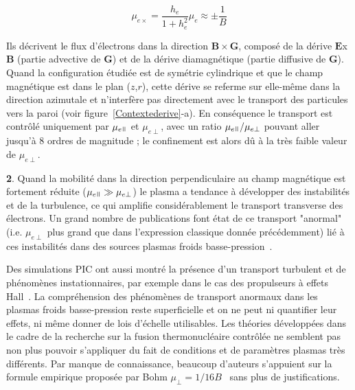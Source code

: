 \begin{refsection}
\begin{equation}
\mu_{e\times}=\frac{h_e}{1+h_e^2}\mu_e\approx\pm\frac{1}{B}
\end{equation}

Ils décrivent le flux d'électrons dans la direction $\mathbf
B\times\mathbf G$, composé de la dérive $\mathbf E$x$\mathbf B$ (partie
advective de $\mathbf G$) et de la dérive diamagnétique (partie diffusive de
$\mathbf G$). Quand la configuration étudiée est de symétrie cylindrique et que le champ magnétique est
dans le plan ($z$,$r$), cette dérive se referme sur elle-même dans la direction
azimutale et n'interfère pas directement avec le transport des particules vers
la paroi (voir figure~\ref{Contextederive}-a). En conséquence le transport est
contrôlé uniquement par $\mu_{e\para}$ et $\mu_{e\perp}$, avec un ratio $\mu_{e\para}/\mu_{e\perp}$ pouvant aller
jusqu'à 8 ordres de magnitude ; le confinement est alors dû à la très faible
valeur de $\mu_{e\perp}$.
\vspace{1cm}

\textbf{2}. Quand la mobilité dans la direction perpendiculaire au champ
magnétique est fortement réduite ($\mu_{e\para}\gg\mu_{e\perp}$) le plasma a tendance à
développer des instabilités et de la turbulence, ce qui amplifie
considérablement le transport transverse des électrons. Un grand nombre de
publications font état de ce transport "anormal" (i.e.
$\mu_{e\perp}$ plus grand que dans l'expression classique donnée précédemment)
lié à ces instabilités dans des sources plasmas froids
basse-pression~\parencite{Bradley,Adam}.

Des simulations PIC ont aussi montré
la présence d'un transport turbulent et de phénomènes instationnaires, par
exemple dans le cas des propulseurs à effets Hall~\cite{Adam08}. La
compréhension des phénomènes de transport anormaux dans les plasmas froids
basse-pression reste superficielle et on ne peut ni quantifier leur effets, ni
même donner de lois d'échelle utilisables.
Les théories développées dans le cadre de la recherche sur la fusion
thermonucléaire contrôlée ne semblent pas non plus pouvoir s'appliquer du fait de conditions et
de paramètres plasmas très différents. Par manque de connaissance,
beaucoup d'auteurs s'appuient sur la formule empirique proposée par Bohm
$\mu_\perp=1/16B$~\parencite{Bohm} sans plus de justifications.
\vspace{1cm}


\end{refsection}

